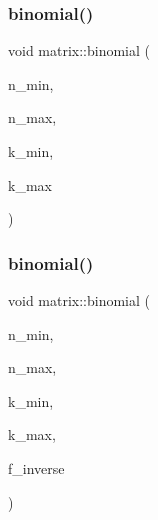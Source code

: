 \subsubsection{\texorpdfstring{binomial()}{binomial()}\hspace{0.1cm}{\footnotesize\ttfamily [1/2]}}
{\footnotesize\ttfamily void matrix\+::binomial (\begin{DoxyParamCaption}\item[{\mbox{\hyperlink{galois_8h_a09fddde158a3a20bd2dcadb609de11dc}{I\+NT}}}]{n\+\_\+min,  }\item[{\mbox{\hyperlink{galois_8h_a09fddde158a3a20bd2dcadb609de11dc}{I\+NT}}}]{n\+\_\+max,  }\item[{\mbox{\hyperlink{galois_8h_a09fddde158a3a20bd2dcadb609de11dc}{I\+NT}}}]{k\+\_\+min,  }\item[{\mbox{\hyperlink{galois_8h_a09fddde158a3a20bd2dcadb609de11dc}{I\+NT}}}]{k\+\_\+max }\end{DoxyParamCaption})}

\mbox{\label{classmatrix_a58a9004174ad450f80faba4db8c1be1c}} 
\subsubsection{\texorpdfstring{binomial()}{binomial()}\hspace{0.1cm}{\footnotesize\ttfamily [2/2]}}
{\footnotesize\ttfamily void matrix\+::binomial (\begin{DoxyParamCaption}\item[{\mbox{\hyperlink{galois_8h_a09fddde158a3a20bd2dcadb609de11dc}{I\+NT}}}]{n\+\_\+min,  }\item[{\mbox{\hyperlink{galois_8h_a09fddde158a3a20bd2dcadb609de11dc}{I\+NT}}}]{n\+\_\+max,  }\item[{\mbox{\hyperlink{galois_8h_a09fddde158a3a20bd2dcadb609de11dc}{I\+NT}}}]{k\+\_\+min,  }\item[{\mbox{\hyperlink{galois_8h_a09fddde158a3a20bd2dcadb609de11dc}{I\+NT}}}]{k\+\_\+max,  }\item[{\mbox{\hyperlink{galois_8h_a09fddde158a3a20bd2dcadb609de11dc}{I\+NT}}}]{f\+\_\+inverse }\end{DoxyParamCaption})}

\mbox{\label{classmatrix_a61ce2d156303d0a83652cc86c2ad51b7}} 
